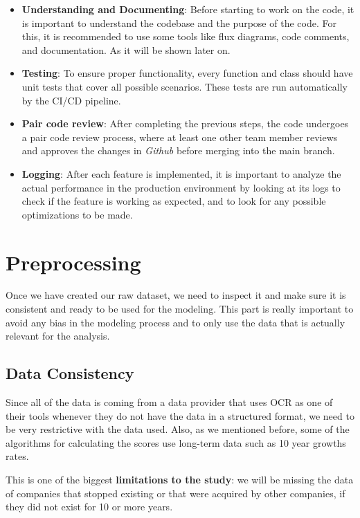 \documentclass[11pt,english,a4paper,hidelinks]{book}
\begin{document}
\begin{itemize}
  \item \textbf{Understanding and Documenting}: Before starting to work on the code, it is important to understand the codebase and the purpose of the code. For this, it is recommended to use some tools like flux diagrams, code comments, and documentation. As it will be shown later on.
  \item \textbf{Testing}: To ensure proper functionality, every function and class should have unit tests that cover all possible scenarios. These tests are run automatically by the CI/CD pipeline.
  \item \textbf{Pair code review}: After completing the previous steps, the code undergoes a pair code review process, where at least one other team member reviews and approves the changes in \textit{Github} before merging into the main branch.
  \item \textbf{Logging}: After each feature is implemented, it is important to analyze the actual performance in the production environment by looking at its logs to check if the feature is working as expected, and to look for any possible optimizations to be made.
\end{itemize}

\section{Preprocessing}

Once we have created our raw dataset, we need to inspect it and make sure it is consistent and ready to be used for the modeling. This part is really important to avoid any bias in the modeling process and to only use the data that is actually relevant for the analysis.

\subsection{Data Consistency}

Since all of the data is coming from a data provider that uses OCR as one of their tools whenever they do not have the data in a structured format, we need to be very restrictive with the data used. Also, as we mentioned before, some of the algorithms for calculating the scores use long-term data such as 10 year growths rates.

\vspace{0.5cm}
\noindent This is one of the biggest \textbf{limitations to the study}: we will be missing the data of companies that stopped existing or that were acquired by other companies, if they did not exist for 10 or more years.
\end{document}
